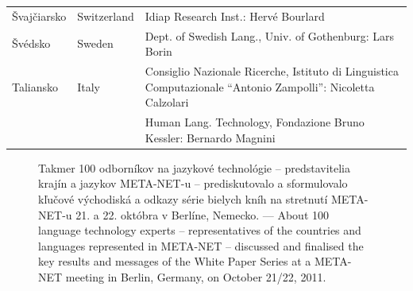 \begin{longtable}{@{}llp{113mm}@{}}
  Švajčiarsko & \textcolor{grey1}{Switzerland} & Idiap Research Inst.: Hervé Bourlard \\ \addlinespace 
  Švédsko & \textcolor{grey1}{Sweden} & Dept. of Swedish Lang., Univ. of Gothenburg: Lars Borin \\ \addlinespace 
  Taliansko & \textcolor{grey1}{Italy} & Consiglio Nazionale Ricerche, Istituto di Linguistica Computazionale “Antonio Zampolli”: Nicoletta Calzolari\\ \addlinespace  & & Human Lang. Technology, Fondazione Bruno Kessler: Bernardo Magnini
\end{longtable}
\normalsize

\renewcommand*{\figureformat}{}
\renewcommand*{\captionformat}{}

\begin{figure}[htbp]
  \center
  \caption{Takmer 100 odborníkov na jazykové technológie – predstavitelia krajín a jazykov META-NET-u – prediskutovalo a sformulovalo kľučové východiská a odkazy série bielych kníh na stretnutí META-NET-u 21. a 22. októbra v Berlíne, Nemecko. --- \textcolor{grey1}{About 100 language technology experts -- representatives of the countries and languages represented in META-NET -- discussed and finalised the key results and messages of the White Paper Series at a META-NET meeting in Berlin, Germany, on October 21/22, 2011.}}
  \medskip
\end{figure}

\cleardoublepage
{}
\label{whitepaperseries}

